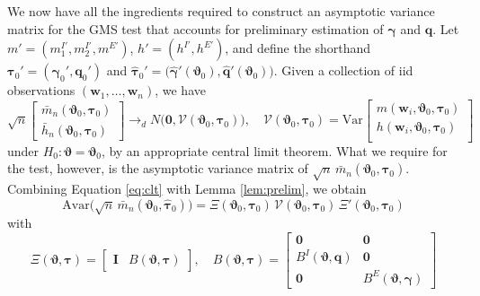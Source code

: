 We now have all the ingredients required to construct an asymptotic variance matrix for the GMS test that accounts for preliminary estimation of $\boldsymbol{\gamma}$ and $\mathbf{q}$. 
Let $m' = (m_1^{I'}, m_{2}^{I'}, m^{E'})$, $h' = (h^{I'}, h^{E'})$, and define the shorthand $\boldsymbol{\tau}_0' = (\boldsymbol{\gamma}_0', \mathbf{q}_0')$ and 
$\widehat{\boldsymbol{\tau}}_0' = \big( \widehat{\boldsymbol{\gamma}}'(\boldsymbol{\vartheta}_0), \widehat{\mathbf{q}}'(\boldsymbol{\vartheta}_0) \big)$.
Given a collection of iid observations $(\mathbf{w}_1, \hdots, \mathbf{w}_n)$, we have
\begin{equation}
  \sqrt{n}\left[
  \begin{array}{c}
    \bar{m}_n(\boldsymbol{\vartheta}_0, \boldsymbol{\tau}_0)\\
    \bar{h}_n(\boldsymbol{\vartheta}_0, \boldsymbol{\tau}_0)
  \end{array}
\right] \rightarrow_d N\big(\mathbf{0},  \mathcal{V}(\boldsymbol{\vartheta}_0, \boldsymbol{\tau}_0)\big), \quad
  \mathcal{V}(\boldsymbol{\vartheta}_0, \boldsymbol{\tau}_0) = \mbox{Var}\left[
  \begin{array}{c}
  m(\mathbf{w}_i, \boldsymbol{\vartheta}_0, \boldsymbol{\tau}_0) \\
  h(\mathbf{w}_i, \boldsymbol{\vartheta}_0, \boldsymbol{\tau}_0)\\
  \end{array}
\right]
\label{eq:clt}
\end{equation}
under $H_0\colon \boldsymbol{\vartheta} = \boldsymbol{\vartheta}_0$, by an appropriate central limit theorem.
What we require for the test, however, is the asymptotic variance matrix of $\sqrt{n}\, \bar{m}_n(\boldsymbol{\vartheta}_0,\widehat{\boldsymbol{\tau}}_0)$.
Combining Equation \ref{eq:clt} with Lemma \ref{lem:prelim}, we obtain 
\begin{equation}
  \mbox{Avar}\big(\sqrt{n}\, \bar{m}_n(\boldsymbol{\vartheta}_0,\widehat{\boldsymbol{\tau}}_0)\big) = \Xi(\boldsymbol{\vartheta}_0, \boldsymbol{\tau}_0)\, \mathcal{V}(\boldsymbol{\vartheta}_0, \boldsymbol{\tau}_0)\, \Xi'(\boldsymbol{\vartheta}_0, \boldsymbol{\tau}_0)
\end{equation}
with
\begin{equation}
  \Xi(\boldsymbol{\vartheta}, \boldsymbol{\tau}) = \left[
  \begin{array}{cc}
    \mathbf{I} & B(\boldsymbol{\vartheta}, \boldsymbol{\tau})
  \end{array}
\right], \quad
  B(\boldsymbol{\vartheta}, \boldsymbol{\tau})= \left[
\begin{array}{cc}
  \mathbf{0} & \mathbf{0}\\
  B^I(\boldsymbol{\vartheta}, \mathbf{q}) & \mathbf{0}\\
  \mathbf{0} & B^E(\boldsymbol{\vartheta}, \boldsymbol{\gamma})
\end{array}
\right]
\label{eq:Xi}
\end{equation}
